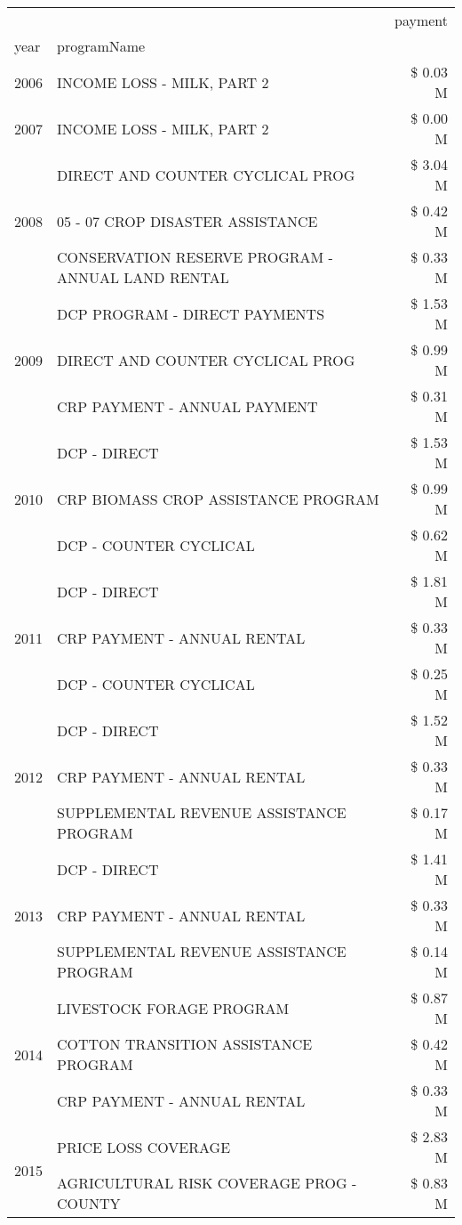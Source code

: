 \begin{tabular}{llr}
\toprule
 &  & payment \\
year & programName &  \\
\midrule
2006 & INCOME LOSS - MILK, PART 2 & \$ 0.03 M \\
\cline{1-3}
2007 & INCOME LOSS - MILK, PART 2 & \$ 0.00 M \\
\cline{1-3}
\multirow[t]{3}{*}{2008} & DIRECT AND COUNTER CYCLICAL PROG & \$ 3.04 M \\
 & 05 - 07 CROP DISASTER ASSISTANCE & \$ 0.42 M \\
 & CONSERVATION RESERVE PROGRAM - ANNUAL LAND RENTAL & \$ 0.33 M \\
\cline{1-3}
\multirow[t]{3}{*}{2009} & DCP PROGRAM - DIRECT PAYMENTS & \$ 1.53 M \\
 & DIRECT AND COUNTER CYCLICAL PROG & \$ 0.99 M \\
 & CRP PAYMENT - ANNUAL PAYMENT & \$ 0.31 M \\
\cline{1-3}
\multirow[t]{3}{*}{2010} & DCP - DIRECT & \$ 1.53 M \\
 & CRP BIOMASS CROP ASSISTANCE PROGRAM & \$ 0.99 M \\
 & DCP - COUNTER CYCLICAL & \$ 0.62 M \\
\cline{1-3}
\multirow[t]{3}{*}{2011} & DCP - DIRECT & \$ 1.81 M \\
 & CRP PAYMENT - ANNUAL RENTAL & \$ 0.33 M \\
 & DCP - COUNTER CYCLICAL & \$ 0.25 M \\
\cline{1-3}
\multirow[t]{3}{*}{2012} & DCP - DIRECT & \$ 1.52 M \\
 & CRP PAYMENT - ANNUAL RENTAL & \$ 0.33 M \\
 & SUPPLEMENTAL REVENUE ASSISTANCE PROGRAM & \$ 0.17 M \\
\cline{1-3}
\multirow[t]{3}{*}{2013} & DCP - DIRECT & \$ 1.41 M \\
 & CRP PAYMENT - ANNUAL RENTAL & \$ 0.33 M \\
 & SUPPLEMENTAL REVENUE ASSISTANCE PROGRAM & \$ 0.14 M \\
\cline{1-3}
\multirow[t]{3}{*}{2014} & LIVESTOCK FORAGE PROGRAM & \$ 0.87 M \\
 & COTTON TRANSITION ASSISTANCE PROGRAM & \$ 0.42 M \\
 & CRP PAYMENT - ANNUAL RENTAL & \$ 0.33 M \\
\cline{1-3}
\multirow[t]{3}{*}{2015} & PRICE LOSS COVERAGE & \$ 2.83 M \\
 & AGRICULTURAL RISK COVERAGE PROG - COUNTY & \$ 0.83 M \\

\end{tabular}
